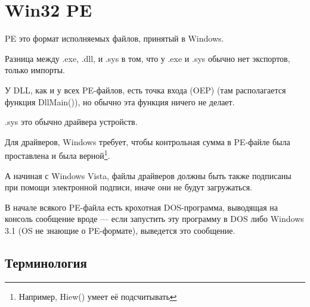 \section{Win32 PE}
\label{win32_pe}

\acs{PE} это формат исполняемых файлов, принятый в Windows.

Разница между .exe, .dll, и .sys в том, что у .exe и .sys обычно нет экспортов, только импорты.

У \ac{DLL}, как и у всех PE-файлов, есть точка входа (\ac{OEP})
(там располагается функция DllMain()), но обычно эта функция ничего не делает.

.sys это обычно драйвера устройств.

Для драйверов, Windows требует, чтобы контрольная сумма в PE-файле была проставлена и была верной\footnote{Например, Hiew() умеет её подсчитывать}.

А начиная с Windows Vista, файлы драйверов должны быть также подписаны при помощи электронной подписи, иначе они не будут загружаться.


В начале всякого PE-файла есть крохотная DOS-программа,
выводящая на консоль сообщение вроде  --- если запустить эту программу в DOS либо Windows 3.1 (\ac{OS} не знающие о PE-формате), 
выведется это сообщение.

\subsection{Терминология}

